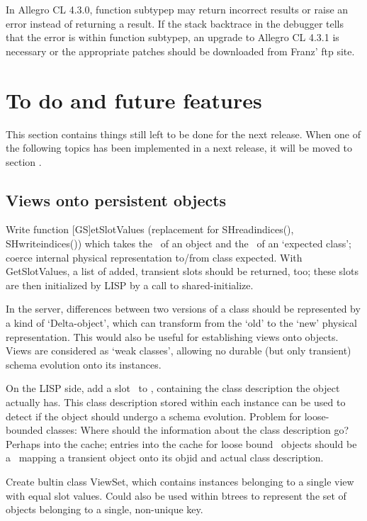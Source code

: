 In Allegro CL 4.3.0, function subtypep may return incorrect results or
raise an error instead of returning a result. If the stack backtrace
in the debugger tells that the error is within function subtypep,
an upgrade to Allegro CL 4.3.1 is necessary or the appropriate
patches should be downloaded from Franz' ftp site.

\section{To do and future features}

This section contains things still left to be done for the next
release. When one of the following topics has been implemented in a
next release, it will be moved to section .

\subsection{Views onto persistent objects}%
\label{sec:Views}

Write function [GS]etSlotValues (replacement for
SH\us{}read\us{}indices(), SH\us{}write\us{}indices()) which takes the
\objid\ of an object and the \objid\ of an `expected class'; coerce
internal physical representation to/from class expected. With
GetSlotValues, a list of added, transient slots should be returned,
too; these slots are then initialized by LISP by a call to
shared-initialize.

In the server, differences between two versions of a class should be
represented by a kind of `Delta-object', which can transform from the
`old' to the `new' physical representation. This would also be useful
for establishing views onto objects. Views are considered as `weak
classes', allowing no durable (but only transient) schema evolution
onto its instances.

On the LISP side, add a slot \ to
, containing the class description the
object actually has. This class description stored within each
instance can be used to detect if the object should undergo a schema
evolution.  Problem for loose-bounded classes: Where should the
information about the class description go? Perhaps into the cache;
entries into the cache for loose bound \clos\ objects should be a
\ mapping a transient object onto its objid and actual
class description.

Create bultin class ViewSet, which contains instances belonging to a
single view with equal slot values. Could also be used within btrees
to represent the set of objects belonging to a single, non-unique key.

